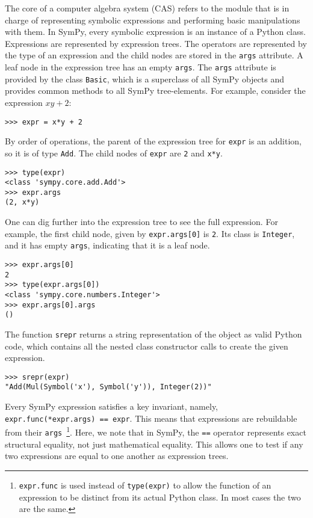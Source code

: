 The core of a computer algebra system (CAS) refers to the module that is in
charge of representing symbolic expressions and performing basic manipulations
with them. In SymPy, every symbolic expression is an instance of a Python class.
Expressions are represented by expression trees. The operators are represented
by the type of an expression and the child nodes are stored in the
\texttt{args} attribute. A leaf node in the expression tree has an empty
\texttt{args}.
The \texttt{args} attribute is provided by the class \texttt{Basic},
which is a superclass of all SymPy objects and
provides common methods to all SymPy tree-elements.
For example, consider the expression $xy + 2$:
\begin{verbatim}
>>> expr = x*y + 2
\end{verbatim}
By order of operations, the parent of the expression tree for \texttt{expr} is
an addition, so it is of type \texttt{Add}. The child nodes of \texttt{expr} are
\texttt{2} and \texttt{x*y}.
\begin{verbatim}
>>> type(expr)
<class 'sympy.core.add.Add'>
>>> expr.args
(2, x*y)
\end{verbatim}

One can dig further into the expression tree to see the full expression. For
example, the first child node, given by \texttt{expr.args[0]} is
\texttt{2}. Its class is \texttt{Integer}, and it has empty \texttt{args},
indicating that it is a leaf node.
\begin{verbatim}
>>> expr.args[0]
2
>>> type(expr.args[0])
<class 'sympy.core.numbers.Integer'>
>>> expr.args[0].args
()
\end{verbatim}

The function \texttt{srepr} returns a string representation of the object as
valid Python code, which contains all the nested class constructor calls to
create the given expression.
\begin{verbatim}
>>> srepr(expr)
"Add(Mul(Symbol('x'), Symbol('y')), Integer(2))"
\end{verbatim}

Every SymPy expression satisfies a key invariant, namely,
\verb|expr.func(*expr.args) == expr|. This means that expressions are
rebuildable from their \texttt{args}~\footnote{\texttt{expr.func} is used
instead of \texttt{type(expr)} to allow the function of an expression to be
distinct from its actual Python class. In most cases the two are the same.}.
Here, we note that in SymPy, the \texttt{==} operator represents exact
structural equality, not just mathematical equality. This allows one to test if
any two expressions are equal to one another as expression trees.

